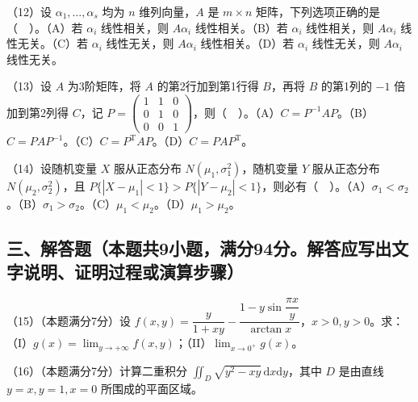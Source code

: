 \documentclass[UTF8,12pt]{ctexart}
\begin{document}
（12）设 \(\displaystyle \alpha_1,\allowbreak \ldots,\allowbreak \alpha_s\) 均为 \(\displaystyle n\) 维列向量，\(\displaystyle A\) 是 \(\displaystyle m\times n\) 矩阵，下列选项正确的是（　）。（A）若 \(\displaystyle \alpha_i\) 线性相关，则 \(\displaystyle A\alpha_i\) 线性相关。（B）若 \(\displaystyle \alpha_i\) 线性相关，则 \(\displaystyle A\alpha_i\) 线性无关。（C）若 \(\displaystyle \alpha_i\) 线性无关，则 \(\displaystyle A\alpha_i\) 线性相关。（D）若 \(\displaystyle \alpha_i\) 线性无关，则 \(\displaystyle A\alpha_i\) 线性无关。


（13）设 \(\displaystyle A\) 为3阶矩阵，将 \(\displaystyle A\) 的第2行加到第1行得 \(\displaystyle B\)，再将 \(\displaystyle B\) 的第1列的 \(\displaystyle -1\) 倍加到第2列得 \(\displaystyle C\)，记 \(\displaystyle P=\begin{pmatrix}1&1&0\\0&1&0\\0&0&1\end{pmatrix}\)，则（　）。（A）\(\displaystyle C=P^{-1}AP\)。（B）\(\displaystyle C=PAP^{-1}\)。（C）\(\displaystyle C=P^{\mathrm T}AP\)。（D）\(\displaystyle C=PAP^{\mathrm T}\)。


（14）设随机变量 \(\displaystyle X\) 服从正态分布 \(\displaystyle N(\mu_1,\allowbreak \sigma_1^2)\)，随机变量 \(\displaystyle Y\) 服从正态分布 \(\displaystyle N(\mu_2,\allowbreak \sigma_2^2)\)，且 \(\displaystyle P\{|X-\mu_1|<1\}>P\{|Y-\mu_2|<1\}\)，则必有（　）。（A）\(\displaystyle \sigma_1<\sigma_2\)。（B）\(\displaystyle \sigma_1>\sigma_2\)。（C）\(\displaystyle \mu_1<\mu_2\)。（D）\(\displaystyle \mu_1>\mu_2\)。


\subsection*{三、解答题（本题共9小题，满分94分。解答应写出文字说明、证明过程或演算步骤）}

（15）（本题满分7分）设 \(\displaystyle f(x,\allowbreak y)=\dfrac{\displaystyle y}{\displaystyle 1+xy}-\dfrac{\displaystyle 1-y\sin\dfrac{\displaystyle \pi x}{\displaystyle y}}{\displaystyle \arctan x}\)，\(\displaystyle x>0,\allowbreak y>0\)。求：（I）\(\displaystyle g(x)=\displaystyle \lim_{y\to+\infty}f(x,\allowbreak y)\)；（II）\(\displaystyle \lim_{x\to0^+}g(x)\)。


（16）（本题满分7分）计算二重积分 \(\displaystyle \iint_D\sqrt{y^2-xy}\,\mathrm dx\mathrm dy\)，其中 \(\displaystyle D\) 是由直线 \(\displaystyle y=x,\allowbreak y=1,\allowbreak x=0\) 所围成的平面区域。
\end{document}
